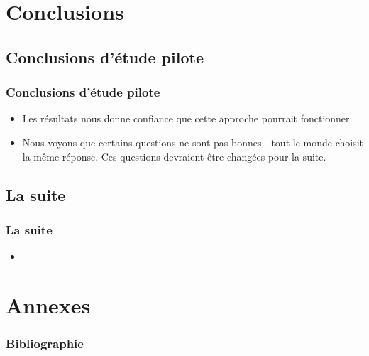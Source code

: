 \documentclass{beamer}
\begin{document}
\section{Conclusions}
\subsection{Conclusions d'étude pilote}
\begin{frame}
\frametitle{Conclusions d'étude pilote}
  \begin{itemize}
  \item Les résultats nous donne confiance que cette approche pourrait fonctionner.
  \item Nous voyons que certains questions ne sont pas bonnes - tout le monde
    choisit la même réponse. Ces questions devraient être changées pour la suite.
  \end{itemize}
\end{frame}

\subsection{La suite}
\begin{frame}
  \frametitle{La suite}
  \begin{itemize}
  \item   
  \end{itemize}
\end{frame}


\section{Annexes}
\begin{frame}
\frametitle{Bibliographie}
\end{frame}
\end{document}
